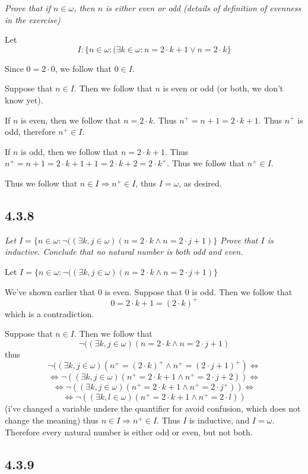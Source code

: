 \documentclass[11pt,oneside,titlepage]{book}
\DeclareMathOperator \lra {\Leftrightarrow}
\DeclareMathOperator \ra {\Rightarrow}
\begin{document}
\textit{Prove that if $n \in \omega$, then $n$ is either even or odd (details of definition
  of evenness in the exercise)}

Let
$$I: \{n \in \omega: (\exists k \in \omega: n = 2 \cdot k + 1 \lor n = 2 \cdot k\}$$

Since $0 = 2 \cdot 0$, we follow that $0 \in I$.

Suppose that $n \in I$. Then we follow that $n$ is even or odd (or both, we don't know yet).

If $n$ is even, then we follow that $n = 2 \cdot k$. Thus $n^+ = n + 1 = 2 \cdot k + 1$. Thus
$n^+$ is odd, therefore $n^+ \in I$.

If $n$ is odd, then we follow that $n = 2 \cdot k + 1$. Thus $n^+ = n + 1 = 2 \cdot k + 1 + 1 =
2 \cdot k + 2 = 2 \cdot k^+$. Thus we follow that $n^+ \in I$.

Thus we follow that $n \in I \ra n^+ \in I$, thus $I = \omega$, as desired.

\subsection*{4.3.8}

\textit{Let $I = \{n \in \omega: \neg((\exists k, j \in \omega)(n = 2 \cdot k \land
  n = 2 \cdot j + 1)\}$
  Prove that $I$ is inductive. Conclude that no natural number is both odd and even.}

Let
$I = \{n \in \omega: \neg((\exists k, j \in \omega)(n = 2 \cdot k \land n = 2 \cdot j + 1)\}$

We've shown earlier that $0$ is even. Suppose that $0$ is odd. Then we follow that
$$0 = 2 \cdot k + 1 = (2 \cdot k)^+$$
which is a contradiction.

Suppose that $n \in I$. Then we follow that
$$\neg((\exists k, j \in \omega)(n = 2 \cdot k \land n = 2 \cdot j + 1)$$
thus
$$\neg((\exists k, j \in \omega)(n^+ = (2 \cdot k)^+ \land n^+ = (2 \cdot j + 1)^+) \lra$$
$$\lra \neg((\exists k, j \in \omega)(n^+ = 2 \cdot k + 1 \land n^+ = 2 \cdot j + 2))\lra $$
$$\lra \neg((\exists k, j \in \omega)(n^+ = 2 \cdot k + 1 \land n^+ = 2 \cdot j^+))\lra$$
$$\lra \neg((\exists k, l \in \omega)(n^+ = 2 \cdot k + 1 \land n^+ = 2 \cdot l))$$
(i've changed a variable undere the quantifier for avoid confusion, which does not change the
meaning)
thus $n \in I \ra n^+ \in I$. Thus $I$ is inductive, and $I = \omega$. Therefore
every natural number is either odd or even, but not both.


\subsection*{4.3.9}
\end{document}

